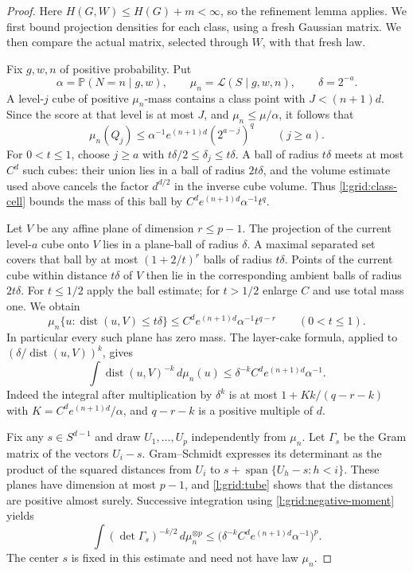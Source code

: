 \begin{proof}
Here $H(G,W)\le H(G)+m<\infty$, so the refinement lemma applies.
We first bound projection densities for each class, using a fresh
Gaussian matrix.  We then compare the actual matrix, selected through
$W$, with that fresh law.

Fix $g,w,n$ of positive probability.  Put
\[
 \alpha=\mathbb P(N=n\mid g,w),\qquad
 \mu_n=\mathcal L(S\mid g,w,n),\qquad \delta=2^{-a}.
\]
A level-$j$ cube of positive $\mu_n$-mass contains a class point with
$J<(n+1)d$.  Since the score at that level is at most $J$, and
$\mu_n\le\mu/\alpha$, it follows that
\begin{equation}\label{l:grid:class-cell}
 \mu_n(Q_j)\le\alpha^{-1}e^{(n+1)d}(2^{a-j})^q
 \qquad(j\ge a).
\end{equation}
For $0<t\le1$, choose $j\ge a$ with
$t\delta/2\le\delta_j\le t\delta$.  A ball of radius $t\delta$
meets at most $C^d$ such cubes: their union lies in a ball of radius
$2t\delta$, and the volume estimate used above cancels the factor
$d^{d/2}$ in the inverse cube volume.  Thus \eqref{l:grid:class-cell}
bounds the mass of this ball by
$C^de^{(n+1)d}\alpha^{-1}t^q$.

Let $V$ be any affine plane of dimension $r\le p-1$.  The projection
of the current level-$a$ cube onto $V$ lies in a plane-ball of radius
$\delta$.  A maximal separated set covers that ball by at most
$(1+2/t)^r$ balls of radius $t\delta$.  Points of the current cube
within distance $t\delta$ of $V$ then lie in the corresponding ambient
balls of radius $2t\delta$.  For $t\le1/2$ apply the ball estimate;
for $t>1/2$ enlarge $C$ and use total mass one.  We obtain
\begin{equation}\label{l:grid:tube}
 \mu_n\{u:\operatorname{dist}(u,V)\le t\delta\}
 \le C^de^{(n+1)d}\alpha^{-1}t^{q-r}
 \qquad(0<t\le1).
\end{equation}
In particular every such plane has zero mass.  The layer-cake formula,
applied to $(\delta/\operatorname{dist}(u,V))^k$, gives
\begin{equation}\label{l:grid:negative-moment}
 \int\operatorname{dist}(u,V)^{-k}\,d\mu_n(u)
 \le\delta^{-k}C^de^{(n+1)d}\alpha^{-1}.
\end{equation}
Indeed the integral after multiplication by $\delta^k$ is at most
$1+Kk/(q-r-k)$ with $K=C^de^{(n+1)d}/\alpha$, and
$q-r-k$ is a positive multiple of $d$.

Fix any $s\in S^{d-1}$ and draw $U_1,\ldots,U_p$ independently from
$\mu_n$.  Let $\Gamma_s$ be the Gram matrix of the vectors $U_i-s$.
Gram--Schmidt expresses its determinant as the product of the squared
distances from $U_i$ to
$s+\operatorname{span}\{U_h-s:h<i\}$.  These planes have dimension at
most $p-1$, and \eqref{l:grid:tube} shows that the distances are positive
almost surely.  Successive integration using
\eqref{l:grid:negative-moment} yields
\begin{equation}\label{l:grid:gram-moment}
 \int(\det\Gamma_s)^{-k/2}\,d\mu_n^{\otimes p}
 \le\bigl(\delta^{-k}C^de^{(n+1)d}\alpha^{-1}\bigr)^p.
\end{equation}
The center $s$ is fixed in this estimate and need not have law $\mu_n$.


\end{proof}
